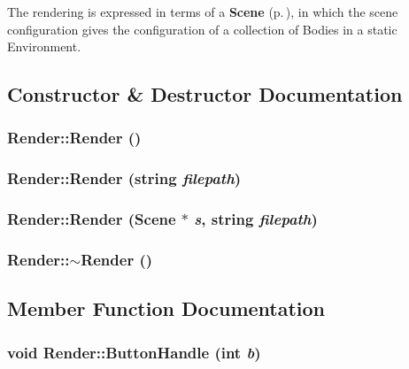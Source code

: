The rendering is expressed in terms of a {\bf Scene} {\rm (p.\,\pageref{class_Scene})}, in which the  scene configuration gives the configuration of a collection of Bodies in a static Environment. 



\subsection{Constructor \& Destructor Documentation}
\subsubsection{\setlength{\rightskip}{0pt plus 5cm}Render::Render ()}\label{class_Render_a0}


\subsubsection{\setlength{\rightskip}{0pt plus 5cm}Render::Render (string {\em filepath})}\label{class_Render_a1}


\subsubsection{\setlength{\rightskip}{0pt plus 5cm}Render::Render ({\bf Scene} $\ast$ {\em s}, string {\em filepath})}\label{class_Render_a2}


\subsubsection{\setlength{\rightskip}{0pt plus 5cm}Render::$\sim$Render ()\hspace{0.3cm}{\tt  [inline, virtual]}}\label{class_Render_a3}




\subsection{Member Function Documentation}
\subsubsection{\setlength{\rightskip}{0pt plus 5cm}void Render::Button\-Handle (int {\em b})\hspace{0.3cm}{\tt  [virtual]}}\label{class_Render_a13}


